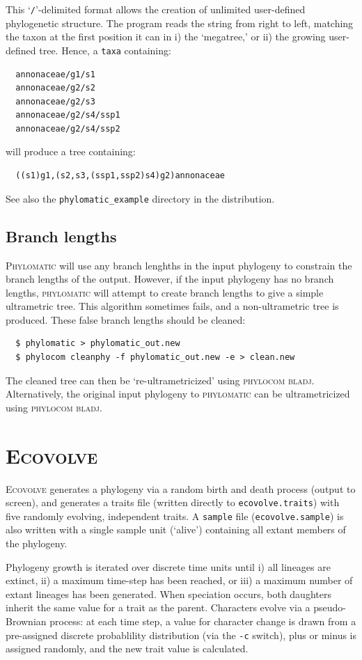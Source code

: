 \documentclass[12pt,letterpaper]{article}
\begin{document}
This `\texttt{/}'-delimited format allows the creation of unlimited
user-defined phylogenetic structure. The program reads the string from
right to left, matching the taxon at the first position it can in i)
the `megatree,' or ii) the growing user-defined tree.  Hence, a
\texttt{taxa} containing:
\begin{verbatim} 
  annonaceae/g1/s1
  annonaceae/g2/s2
  annonaceae/g2/s3
  annonaceae/g2/s4/ssp1
  annonaceae/g2/s4/ssp2
\end{verbatim}
will produce a tree containing:
\begin{verbatim} 
  ((s1)g1,(s2,s3,(ssp1,ssp2)s4)g2)annonaceae
\end{verbatim}

See also the \verb|phylomatic_example| directory in the distribution.

\subsection{Branch lengths}

{\scshape Phylomatic} will use any branch lenghths in the input
phylogeny to constrain the branch lengths of the output.  However, if
the input phylogeny has no branch lengths, {\scshape phylomatic} will
attempt to create branch lengths to give a simple ultrametric tree.
This algorithm sometimes fails, and a non-ultrametric tree is
produced.  These false branch lengths should be cleaned:
\begin{verbatim}
  $ phylomatic > phylomatic_out.new
  $ phylocom cleanphy -f phylomatic_out.new -e > clean.new
\end{verbatim}
The cleaned tree can then be `re-ultrametricized' using {\scshape
phylocom bladj}.  Alternatively, the original input phylogeny to
{\scshape phylomatic} can be ultrametricized using {\scshape               
phylocom bladj}.

\section{\scshape Ecovolve}

{\scshape Ecovolve} generates a phylogeny via a random birth and death
process (output to screen), and generates a traits file (written
directly to \verb|ecovolve.traits|) with five randomly evolving,
independent traits.  A \verb|sample| file (\verb|ecovolve.sample|) is
also written with a single sample unit (`alive') containing all extant
members of the phylogeny.

Phylogeny growth is iterated over discrete time units until i) all
lineages are extinct, ii) a maximum time-step has been reached, or
iii) a maximum number of extant lineages has been generated.  When
speciation occurs, both daughters inherit the same value for a trait
as the parent.  Characters evolve via a pseudo-Brownian process: at
each time step, a value for character change is drawn from a
pre-assigned discrete probablility distribution (via the \verb|-c|
switch), plus or minus is assigned randomly, and the new trait value
is calculated.
\end{document}
